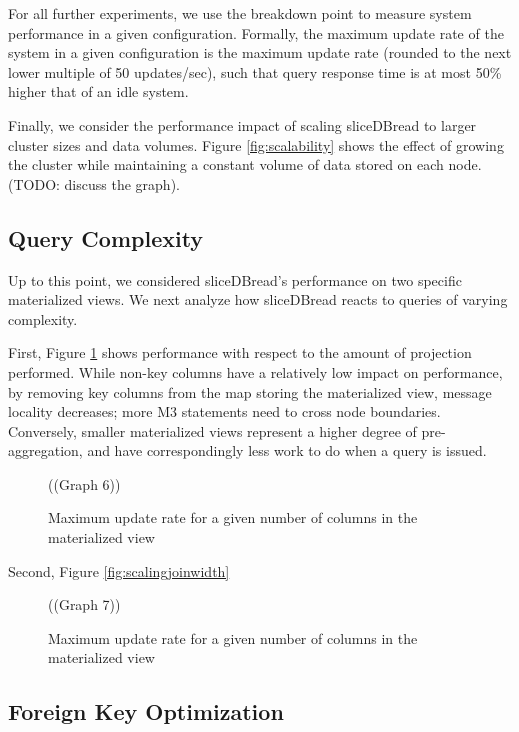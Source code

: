 For all further experiments, we use the breakdown point to measure system performance in a given configuration.  Formally, the maximum update rate of the system in a given configuration is the maximum update rate (rounded to the next lower multiple of 50 updates/sec), such that query response time is at most 50\% higher that of an idle system.

Finally, we consider the performance impact of scaling sliceDBread to larger cluster sizes and data volumes.  Figure \ref{fig:scalability} shows the effect of growing the cluster while maintaining a constant volume of data stored on each node.  (TODO: discuss the graph).

\subsection{Query Complexity}
\label{sec:exp:complexity}
Up to this point, we considered sliceDBread's performance on two specific materialized views.  We next analyze how sliceDBread reacts to queries of varying complexity.  

First, Figure \ref{fig:scalinggroupby} shows performance with respect to the amount of projection performed.  While non-key columns have a relatively low impact on performance, by removing key columns from the map storing the materialized view, message locality decreases; more M3 statements need to cross node boundaries.  Conversely, smaller materialized views represent a higher degree of pre-aggregation, and have correspondingly less work to do when a query is issued.

\begin{figure}
((Graph 6))
\caption{Maximum update rate for a given number of columns in the materialized view}
\label{fig:scalinggroupby}
\end{figure}

Second, Figure \ref{fig:scalingjoinwidth}

\begin{figure}
((Graph 7))
\caption{Maximum update rate for a given number of columns in the materialized view}
\end{figure}

\subsection{Foreign Key Optimization}
\label{sec:exp:fkoptimization}



% 
